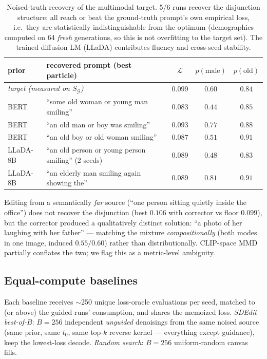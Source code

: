 \documentclass[11pt]{article}
\newcommand{\G}{\mathcal{G}}
\newcommand{\Ploss}{\mathcal{L}}
\begin{document}
\begin{table}[h]
\centering
\small
\begin{tabular}{llccc}
\toprule
prior & recovered prompt (best particle) & $\Ploss$ & $p(\mathrm{male})$ & $p(\mathrm{old})$ \\
\midrule
\multicolumn{2}{l}{\emph{target (measured on $S_\G$)}} & $0.099$ & $0.60$ & $0.84$ \\
\midrule
BERT  & ``some old woman or young man smiling'' & $0.083$ & $0.44$ & $0.85$ \\
BERT  & ``an old man or boy was smiling''       & $0.093$ & $0.77$ & $0.88$ \\
BERT  & ``an old boy or old woman smiling''     & $0.087$ & $0.51$ & $0.91$ \\
LLaDA-8B & ``an old person or young person smiling'' (2 seeds) & $0.089$ & $0.48$ & $0.83$ \\
LLaDA-8B & ``an elderly man smiling again showing the'' & $0.089$ & $0.81$ & $0.91$ \\
\bottomrule
\end{tabular}
\caption{Noised-truth recovery of the multimodal target. 5/6 runs recover
the disjunction structure; all reach or beat the ground-truth prompt's own
empirical loss, i.e.\ they are statistically indistinguishable from the
optimum (demographics computed on 64 \emph{fresh} generations, so this is
not overfitting to the target set). The trained diffusion LM (LLaDA)
contributes fluency and cross-seed stability.}
\end{table}

Editing from a semantically \emph{far} source (``one person sitting
quietly inside the office'') does not recover the disjunction (best
$0.106$ with corrector vs floor $0.099$), but the corrector produced a
qualitatively distinct solution: ``a photo of her laughing with her father''
--- matching the mixture \emph{compositionally} (both modes in one image,
induced $0.55/0.60$) rather than distributionally. CLIP-space MMD
partially conflates the two; we flag this as a metric-level ambiguity.

\subsection{Equal-compute baselines}
\label{sec:baselines}
Each baseline receives $\sim$250 unique loss-oracle evaluations per seed,
matched to (or above) the guided runs' consumption, and shares the
memoized loss. \emph{SDEdit best-of-$B$}: $B{=}256$ independent
\emph{unguided} denoisings from the same noised source (same prior, same
$t_0$, same top-$k$ reverse kernel --- everything except guidance), keep
the lowest-loss decode. \emph{Random search}: $B{=}256$ uniform-random
canvas fills.
\end{document}
